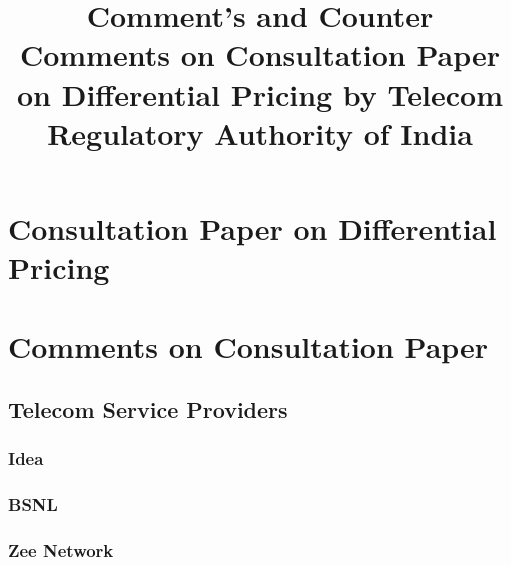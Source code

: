 \documentclass{article}
\title{Comment's and Counter Comments on Consultation Paper on Differential Pricing by Telecom Regulatory
Authority of India}
\begin{document}
\maketitle
\newpage

\tableofcontents
\newpage



%

\section{Consultation Paper on Differential Pricing}


\newpage

\section{Comments on Consultation Paper}

\subsection{Telecom Service Providers}
\subsubsection{Idea}


\subsubsection{BSNL}


\subsubsection{Zee Network}

\end{document}
